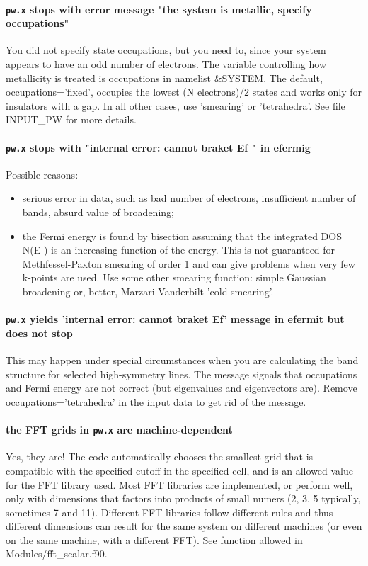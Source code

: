 \documentclass[12pt,a4paper]{article}
\def\pw.x{\texttt{pw.x}}
\begin{document}
\paragraph{\pw.x stops with error message "the system is metallic,
  specify occupations"} 
You did not specify state occupations, but you need to, since your
system appears to have an odd number of electrons. The variable
controlling how metallicity is treated is occupations in namelist
\&SYSTEM. The default, occupations='fixed', occupies the lowest
(N electrons)/2 states and works only for insulators with a gap. In all other
cases, use 'smearing' or 'tetrahedra'. See file INPUT\_PW for more details.

\paragraph{\pw.x stops with "internal error: cannot braket Ef " in efermig}
Possible reasons:
\begin{itemize}
\item serious error in data, such as bad number of electrons,
  insufficient number of bands, absurd value of broadening; 
\item the Fermi energy is found by bisection assuming that the
  integrated DOS N(E ) is an increasing function of the energy. This
  is not guaranteed for Methfessel-Paxton smearing of order 1 and can
  give problems when very few k-points are used. Use some other
  smearing function: simple Gaussian broadening or, better,
  Marzari-Vanderbilt 'cold smearing'. 
\end{itemize}

\paragraph{\pw.x yields 'internal error: cannot braket Ef' message in
  efermit but does not stop} 
This may happen under special circumstances when you are calculating
the band structure for selected high-symmetry lines. The message
signals that occupations and Fermi energy are not correct (but
eigenvalues and eigenvectors are). Remove occupations='tetrahedra' in
the input data to get rid of the message. 

\paragraph{the FFT grids in \pw.x are machine-dependent}
Yes, they are! The code automatically chooses the smallest grid that
is compatible with the 
specified cutoff in the specified cell, and is an allowed value for the FFT
library used. Most FFT libraries are implemented, or perform well, only
with dimensions that factors into products of small numers (2, 3, 5 typically,
sometimes 7 and 11). Different FFT libraries follow different rules and thus
different dimensions can result for the same system on different machines (or
even on the same machine, with a different FFT). See function allowed in
Modules/fft\_scalar.f90.
    
\end{document}
